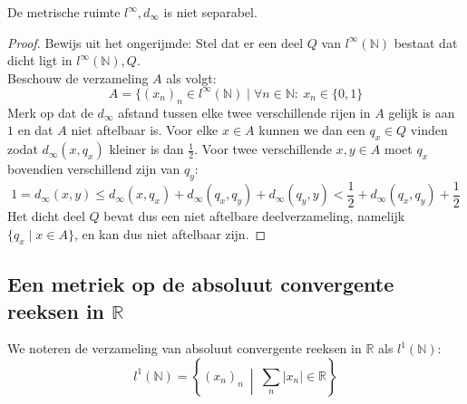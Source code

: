 \documentclass[main.tex]{subfiles}
\begin{document}
\begin{vb}
  De metrische ruimte $l^{\infty},d_{\infty}$ is niet separabel.
  
  \begin{proof}
    Bewijs uit het ongerijmde: Stel dat er een deel $Q$ van $l^{\infty}(\mathbb{N})$ bestaat dat dicht ligt in $l^{\infty}(\mathbb{N}),Q$.\\
    Beschouw de verzameling $A$ als volgt:
    \[ A = \{ (x_{n})_{n} \in l^{\infty}(\mathbb{N}) \mid \forall n\in \mathbb{N}:\ x_{n} \in \{0,1\} \]
    Merk op dat de $d_{\infty}$ afstand tussen elke twee verschillende rijen in $A$ gelijk is aan $1$ en dat $A$ niet aftelbaar is.\waarom
    Voor elke $x\in A$ kunnen we dan een $q_{x}\in Q$ vinden zodat $d_{\infty}(x,q_{x})$ kleiner is dan $\frac{1}{2}$.
    Voor twee verschillende $x,y\in A$ moet $q_{x}$ bovendien verschillend zijn van $q_{y}$:
    \[ 1 = d_{\infty}(x,y) \le d_{\infty}(x,q_{x}) + d_{\infty}(q_{x},q_{y}) + d_{\infty}(q_{y},y) < \frac{1}{2} + d_{\infty}(q_{x},q_{y}) + \frac{1}{2} \]
    Het dicht deel $Q$ bevat dus een niet aftelbare deelverzameling, namelijk $\{q_{x} \mid x\in A\}$, en kan dus niet aftelbaar zijn.
  \end{proof}
\end{vb}


\subsection{Een metriek op de absoluut convergente reeksen in $\mathbb{R}$}
\label{sec:een-metriek-op-2}

\begin{de}
  We noteren de verzameling van absoluut convergente reeksen in $\mathbb{R}$ als $l^{1}(\mathbb{N})$:
  \[ l^{1}(\mathbb{N}) = \left\{ (x_{n})_{n} \ \middle|\ \sum_{n}|x_{n}| \in\mathbb{R} \right\} \]
\end{de}
\end{document}
